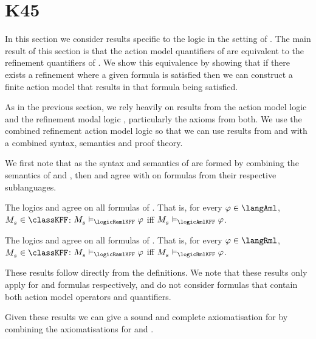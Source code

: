 \section{K45}\label{aaml-kd45}

In this section we consider results specific to the logic \logicAamlKFF{} in the setting of \classKFF{}.
The main result of this section is that the action model quantifiers of \logicAamlKFF{} are equivalent to the refinement quantifiers of \logicRmlKFF{}.
We show this equivalence by showing that if there exists a refinement where a given formula is satisfied then we can construct a finite action model that results in that formula being satisfied.

As in the previous section, we rely heavily on results from the action model logic \logicAmlKFF{} and the refinement modal logic \logicRmlKFF{}, particularly the axioms from both.
We use the combined refinement action model logic \logicRamlKFF{} so that we can use results from \logicAmlKFF{} and \logicRmlKFF{} with a combined syntax, semantics and proof theory.

We first note that as the syntax and semantics of \logicRamlKFF{} are formed by combining the semantics of \logicAmlKFF{} and \logicRmlKFF{}, then \logicAmlKFF{} and \logicRmlKFF{} agree with \logicRamlKFF{} on formulas from their respective sublanguages.

\begin{lemma}\label{raml-k45-aml}
The logics \logicRamlKFF{} and \logicAmlKFF{} agree on all formulas of \langAml{}.
That is, for every $\phi \in \langAml$, $\kPModel{\kStateS} \in \classKFF$: $\kPModel{\kStateS} \entails_\logicRamlKFF \phi$ iff $\kPModel{\kStateS} \entails_\logicAmlKFF \phi$.
\end{lemma}

\begin{lemma}\label{raml-k45-rml}
The logics \logicRamlKFF{} and \logicAmlKFF{} agree on all formulas of \langRml{}.
That is, for every $\phi \in \langRml$, $\kPModel{\kStateS} \in \classKFF$: $\kPModel{\kStateS} \entails_\logicRamlKFF \phi$ iff $\kPModel{\kStateS} \entails_\logicRmlKFF \phi$.
\end{lemma}

These results follow directly from the definitions.
We note that these results only apply for \langAml{} and \langRml{} formulas respectively, and do not consider \langAaml{} formulas that contain both action model operators and quantifiers. 

Given these results we can give a sound and complete axiomatisation for \logicRamlKFF{} by combining the axiomatisations for \logicAmlKFF{} and \logicRmlKFF{}.


